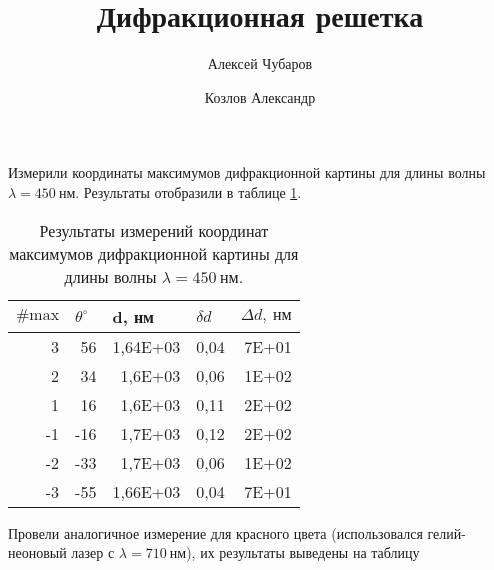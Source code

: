 \documentclass[12pt]{article}
\title{Дифракционная решетка}
\author{Алексей Чубаров \and Козлов Александр}
\begin{document}
\maketitle

Измерили координаты максимумов дифракционной картины для длины волны $\lambda = 450\ \text{нм}$. Результаты отобразили в таблице \ref{tab:1}.
\begin{table}[htbp]
\centering
\caption{Результаты измерений координат максимумов дифракционной картины для длины волны $\lambda = 450\ \text{нм}$.}
\begin{tabular}{|r|r|r|r|r|} 
\hline
\multicolumn{1}{|l|}{$\# \text{max}$} & \multicolumn{1}{l|}{$\theta^\circ$} & \multicolumn{1}{l|}{d, нм} & \multicolumn{1}{l|}{$\delta d$} & \multicolumn{1}{l|}{$\Delta d,\ \text{нм}$}  \\ 
\hline
3                                              & 56                                  & 1,64E+03                   & 0,04                            & 7E+01                                        \\ 
\hline
2                                              & 34                                  & 1,6E+03                    & 0,06                            & 1E+02                                        \\ 
\hline
1                                              & 16                                  & 1,6E+03                    & 0,11                            & 2E+02                                        \\ 
\hline
-1                                             & -16                                 & 1,7E+03                    & 0,12                            & 2E+02                                        \\ 
\hline
-2                                             & -33                                 & 1,7E+03                    & 0,06                            & 1E+02                                        \\ 
\hline
-3                                             & -55                                 & 1,66E+03                   & 0,04                            & 7E+01                                        \\
\hline
\end{tabular}
\label{tab:1}
\end{table}
\par Провели аналогичное измерение для красного цвета (использовался гелий-неоновый лазер с $\lambda = 710\ \text{нм}$), их результаты выведены на таблицу 
\end{document}
